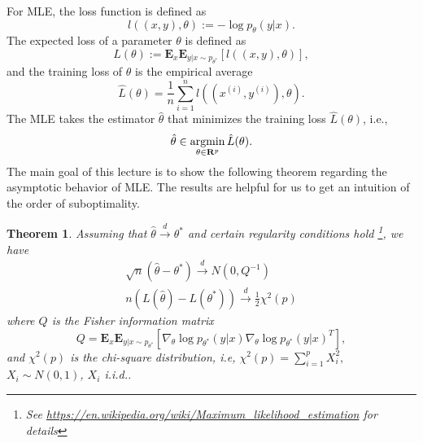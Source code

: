 \documentclass[11pt,letterpaper]{article}
\newcommand{\real}{\mathbf{R}}
\newcommand{\expt}{\mathbf{E}}
\newcommand{\argmin}{\mathop{\rm argmin}}
\newcommand{\gotod}{\overset{d}{\longrightarrow}}
\newtheorem{theorem}{Theorem}
\theoremstyle{definition}
\begin{document}
For MLE, the loss function is defined as
\[
	l((x,y),\theta) := -\log p_{\theta}(y | x).
\]
The expected loss of a parameter $\theta$ is defined as
\[
	L(\theta) := \mathbf{E}_x \expt_{y|x \sim p_{\theta^*}} [l((x,y), \theta)],
\]
and the training loss of $\theta$ is the empirical average
\[
	\hat{L}(\theta )=\frac{1}{n}\sum_{i=1}^{n}l((x^{(i)},y^{(i)}),\theta ).
\]
The MLE takes the estimator $\hat{\theta}$ that minimizes the training loss $\hat{L}(\theta)$, i.e.,
\begin{equation}
	\hat{\theta} \in \argmin_{\theta \in \real^p} \hat{L}(\theta).
	\label{eq:def:thetahat}
\end{equation}
The main goal of this lecture is to show the following theorem regarding the asymptotic behavior of MLE. The results are helpful for us to get an intuition of the order of suboptimality.
\begin{theorem}
\label{thm1}
	Assuming that $\hat{\theta}\gotod \theta^\ast$ and certain regularity conditions hold \footnote{See \url{https://en.wikipedia.org/wiki/Maximum_likelihood_estimation} for details}, we have
	\begin{eqnarray}
			\sqrt{n}(\hat{\theta}-\theta ^{\ast }) \overset{d}{
\longrightarrow }N(0,Q^{-1}) \label{eq:thm1eq1} \\
n(L(\hat{\theta})-L(\theta ^{\ast })) \overset{d}{\longrightarrow }\frac{1%
}{2}\chi ^{2}(p) \label{eq:thm1eq2}
	\end{eqnarray}
where $Q$ is the Fisher information matrix%
\begin{equation*}
Q= \expt_x\expt_{y|x \sim p_{\theta^*}}[\nabla _{\theta }\log p_{\theta ^{\ast }}(y|x)\nabla _{\theta }\log
p_{\theta ^{\ast }}(y|x)^{T}],
\end{equation*}%
and $\chi ^{2}(p)$ is the chi-square distribution, i.e, $\chi
^{2}(p)=\sum_{i=1}^{p}X_{i}^{2},$ $X_i\sim N(0,1)$, $X_i$ i.i.d..
\end{theorem}
\end{document}
